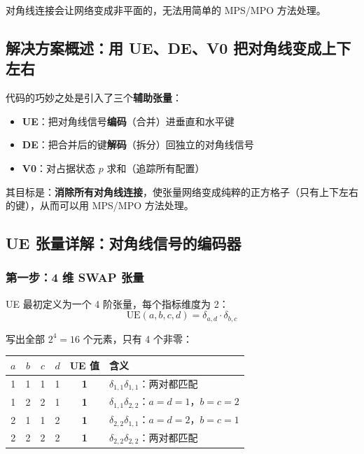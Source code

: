 \documentclass[12pt,a4paper]{article}
\begin{document}
对角线连接会让网络变成非平面的，无法用简单的 MPS/MPO 方法处理。

\subsection{解决方案概述：用 UE、DE、V0 把对角线变成上下左右}

代码的巧妙之处是引入了三个\textbf{辅助张量}：
\begin{itemize}
  \item \textbf{UE}：把对角线信号\textbf{编码}（合并）进垂直和水平键
  \item \textbf{DE}：把合并后的键\textbf{解码}（拆分）回独立的对角线信号
  \item \textbf{V0}：对占据状态 $p$ 求和（追踪所有配置）
\end{itemize}

其目标是：\textbf{消除所有对角线连接}，使张量网络变成纯粹的正方格子（只有上下左右的键），从而可以用 MPS/MPO 方法处理。

\subsection{UE 张量详解：对角线信号的编码器}

\subsubsection{第一步：4 维 SWAP 张量}

UE 最初定义为一个 4 阶张量，每个指标维度为 2：
$$\text{UE}(a, b, c, d) = \delta_{a,d} \cdot \delta_{b,c}$$

写出全部 $2^4 = 16$ 个元素，只有 4 个非零：

\begin{center}
\begin{tabular}{cccc|c|l}
\toprule
$a$ & $b$ & $c$ & $d$ & UE 值 & 含义 \\
\midrule
1 & 1 & 1 & 1 & \textbf{1} & $\delta_{1,1}\delta_{1,1}$：两对都匹配 \\
1 & 2 & 2 & 1 & \textbf{1} & $\delta_{1,1}\delta_{2,2}$：$a{=}d{=}1$，$b{=}c{=}2$ \\
2 & 1 & 1 & 2 & \textbf{1} & $\delta_{2,2}\delta_{1,1}$：$a{=}d{=}2$，$b{=}c{=}1$ \\
2 & 2 & 2 & 2 & \textbf{1} & $\delta_{2,2}\delta_{2,2}$：两对都匹配 \\
\bottomrule
\end{tabular}
\end{center}
\end{document}
